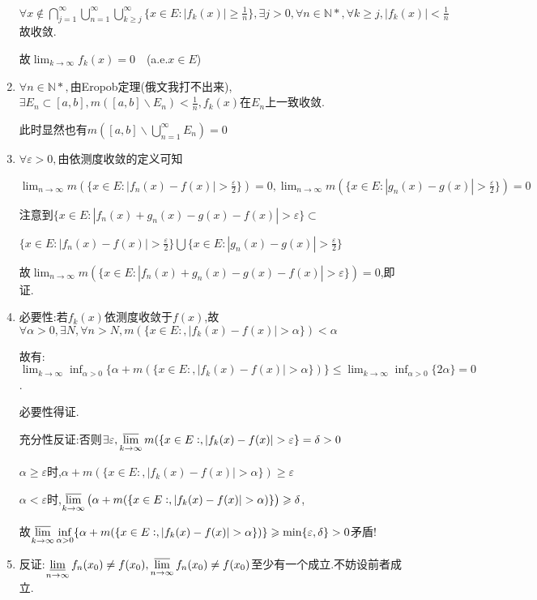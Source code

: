 \documentclass[UTF8, a4paper, 12pt, oneside, onecolumn]{article}
\numberwithin{equation}{section}
\numberwithin{figure}{section}
\numberwithin{table}{section}
\theoremstyle{nonumberplain}	%
\theoremstyle{plain}	%
\theoremstyle{plain}	%
\theoremstyle{plain}	%
\theoremstyle{plain}	%
\theoremstyle{nonumberplain}
\begin{document}
\begin{enumerate}
	$\displaystyle\forall x\notin \bigcap_{j=1}^{\infty}\bigcup_{n=1}^{\infty}\bigcup_{k\geqslant j}^{\infty}\{x\in E:|f_k(x)|\geqslant\frac{1}{n} \},\exists j>0,\forall n\in\mathbb{N*},\forall k\geqslant j,|f_k(x)|<\frac{1}{n}$故收敛.
	
	故$\displaystyle \lim_{k\rightarrow \infty}f_k(x)=0$~~(a.e.$x\in E$)
	
	\item $\forall n\in\mathbb{N*},$由Eropob定理(俄文我打不出来),$\displaystyle\exists E_n\subset [a,b],m([a,b]\backslash E_n)<\frac{1}{n},f_k(x)$在$E_n$上一致收敛.
	
	此时显然也有$\displaystyle m([a,b]\backslash \bigcup_{n= 1}^{\infty}E_n)=0$
	
	\item $\displaystyle \forall \varepsilon>0, $由依测度收敛的定义可知
	
	$\displaystyle\lim_{n\rightarrow \infty}m(\{x\in E:|f_n(x)-f(x)|>\frac\varepsilon2\})=0, \lim_{n\rightarrow \infty}m(\{x\in E:|g_n(x)-g(x)|>\frac\varepsilon2\})=0$
	
	注意到$\{x\in E:|f_n(x)+g_n(x)-g(x)-f(x)|>\varepsilon\}\subset$
	
	$\displaystyle \{x\in E:|f_n(x)-f(x)|>\frac\varepsilon2\}\bigcup\{x\in E:|g_n(x)-g(x)|>\frac\varepsilon2\}$
	
	故$\displaystyle\lim_{n\rightarrow \infty}m(\{x\in E:|f_n(x)+g_n(x)-g(x)-f(x)|>\varepsilon\})=0$,即证.
	
	\item 必要性:若$f_k(x)$依测度收敛于$f(x)$,故$\forall \alpha>0,\exists N,\forall n>N,m(\{x\in E:,|f_k(x)-f(x)|>\alpha\})<\alpha$
	
	故有:$\displaystyle\lim_{k\rightarrow \infty}\inf_{\alpha>0}\{\alpha+m(\{x\in E:,|f_k(x)-f(x)|>\alpha\})\}\leqslant\lim_{k\rightarrow \infty}\inf_{\alpha>0}\{2\alpha\}=0$.
	
	必要性得证.
	
	充分性反证:否则$\displaystyle\exists \varepsilon,\varlimsup_{k\rightarrow \infty}m(\{x\in E:,|f_k(x)-f(x)|>\varepsilon\}=\delta>0 $
	
	$\alpha\geqslant\varepsilon$时,$\displaystyle\alpha+m(\{x\in E:,|f_k(x)-f(x)|>\alpha\})\geqslant \varepsilon$
	
	$\alpha<\varepsilon$时,$\displaystyle\varlimsup_{k\rightarrow \infty}\left( \alpha+m(\{x\in E:,|f_k(x)-f(x)|>\alpha)\}\right) \geqslant \delta$,
	
	故$\displaystyle\varlimsup_{k\rightarrow \infty}\inf_{\alpha>0}\{\alpha+m(\{x\in E:,|f_k(x)-f(x)|>\alpha\})\}\geqslant\min\{\varepsilon,\delta\}>0$矛盾!
	\item 反证:$\displaystyle\varliminf_{n\rightarrow\infty}f_n(x_0)\neq f(x_0),\varlimsup_{n\rightarrow\infty}f_n(x_0)\neq f(x_0)$至少有一个成立.不妨设前者成立.
	

\end{enumerate}
\end{document}
